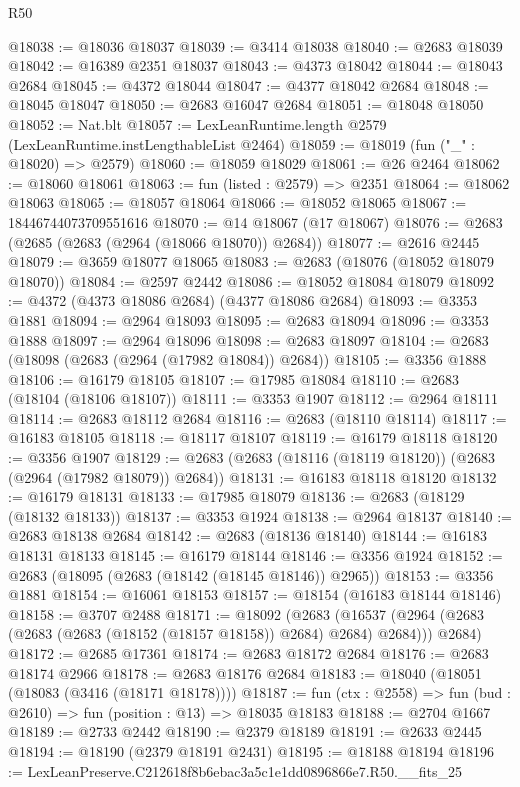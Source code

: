 \begin{lexlean}{R50}
\begin{coremodule}
@18038 := @18036 @18037
@18039 := @3414 @18038
@18040 := @2683 @18039
@18042 := @16389 @2351 @18037
@18043 := @4373 @18042
@18044 := @18043 @2684
@18045 := @4372 @18044
@18047 := @4377 @18042 @2684
@18048 := @18045 @18047
@18050 := @2683 @16047 @2684
@18051 := @18048 @18050
@18052 := Nat.blt
@18057 := LexLeanRuntime.length @2579 (LexLeanRuntime.instLengthableList @2464)
@18059 := @18019 (fun ("_" : @18020) => @2579)
@18060 := @18059 @18029
@18061 := @26 @2464
@18062 := @18060 @18061
@18063 := fun (listed : @2579) => @2351
@18064 := @18062 @18063
@18065 := @18057 @18064
@18066 := @18052 @18065
@18067 := 18446744073709551616
@18070 := @14 @18067 (@17 @18067)
@18076 := @2683 (@2685 (@2683 (@2964 (@18066 @18070)) @2684))
@18077 := @2616 @2445
@18079 := @3659 @18077 @18065
@18083 := @2683 (@18076 (@18052 @18079 @18070))
@18084 := @2597 @2442
@18086 := @18052 @18084 @18079
@18092 := @4372 (@4373 @18086 @2684) (@4377 @18086 @2684)
@18093 := @3353 @1881
@18094 := @2964 @18093
@18095 := @2683 @18094
@18096 := @3353 @1888
@18097 := @2964 @18096
@18098 := @2683 @18097
@18104 := @2683 (@18098 (@2683 (@2964 (@17982 @18084)) @2684))
@18105 := @3356 @1888
@18106 := @16179 @18105
@18107 := @17985 @18084
@18110 := @2683 (@18104 (@18106 @18107))
@18111 := @3353 @1907
@18112 := @2964 @18111
@18114 := @2683 @18112 @2684
@18116 := @2683 (@18110 @18114)
@18117 := @16183 @18105
@18118 := @18117 @18107
@18119 := @16179 @18118
@18120 := @3356 @1907
@18129 := @2683 (@2683 (@18116 (@18119 @18120)) (@2683 (@2964 (@17982 @18079)) @2684))
@18131 := @16183 @18118 @18120
@18132 := @16179 @18131
@18133 := @17985 @18079
@18136 := @2683 (@18129 (@18132 @18133))
@18137 := @3353 @1924
@18138 := @2964 @18137
@18140 := @2683 @18138 @2684
@18142 := @2683 (@18136 @18140)
@18144 := @16183 @18131 @18133
@18145 := @16179 @18144
@18146 := @3356 @1924
@18152 := @2683 (@18095 (@2683 (@18142 (@18145 @18146)) @2965))
@18153 := @3356 @1881
@18154 := @16061 @18153
@18157 := @18154 (@16183 @18144 @18146)
@18158 := @3707 @2488
@18171 := @18092
    (@2683
      (@16537 (@2964 (@2683 (@2683 (@2683 (@18152 (@18157 @18158)) @2684) @2684) @2684)))
      @2684)
@18172 := @2685 @17361
@18174 := @2683 @18172 @2684
@18176 := @2683 @18174 @2966
@18178 := @2683 @18176 @2684
@18183 := @18040 (@18051 (@18083 (@3416 (@18171 @18178))))
@18187 := fun (ctx : @2558) => fun (bud : @2610) => fun (position : @13) => @18035 @18183
@18188 := @2704 @1667
@18189 := @2733 @2442
@18190 := @2379 @18189
@18191 := @2633 @2445
@18194 := @18190 (@2379 @18191 @2431)
@18195 := @18188 @18194
@18196 := LexLeanPreserve.C212618f8b6ebac3a5c1e1dd0896866e7.R50.__fits_25

\end{coremodule}
\end{lexlean}
